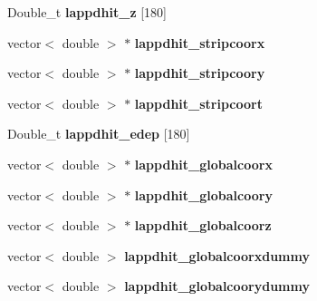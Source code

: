\begin{DoxyCompactItemize}
\item 
\hypertarget{classLAPPDTree_a73e138836f63b843c99fbe3951f7e504}{Double\-\_\-t {\bfseries lappdhit\-\_\-z} \mbox{[}180\mbox{]}}\label{classLAPPDTree_a73e138836f63b843c99fbe3951f7e504}

\item 
\hypertarget{classLAPPDTree_aa5f1d299a73e165905b798a925206de5}{vector$<$ double $>$ $\ast$ {\bfseries lappdhit\-\_\-stripcoorx}}\label{classLAPPDTree_aa5f1d299a73e165905b798a925206de5}

\item 
\hypertarget{classLAPPDTree_a1a9420e83fa6ac964448bd89fb613248}{vector$<$ double $>$ $\ast$ {\bfseries lappdhit\-\_\-stripcoory}}\label{classLAPPDTree_a1a9420e83fa6ac964448bd89fb613248}

\item 
\hypertarget{classLAPPDTree_a07b7a60f594d559022c75cc8962a673e}{vector$<$ double $>$ $\ast$ {\bfseries lappdhit\-\_\-stripcoort}}\label{classLAPPDTree_a07b7a60f594d559022c75cc8962a673e}

\item 
\hypertarget{classLAPPDTree_a361c88caa35c7b75c6625d1726fd3116}{Double\-\_\-t {\bfseries lappdhit\-\_\-edep} \mbox{[}180\mbox{]}}\label{classLAPPDTree_a361c88caa35c7b75c6625d1726fd3116}

\item 
\hypertarget{classLAPPDTree_abbf80a1da763ec467ead614fd4289718}{vector$<$ double $>$ $\ast$ {\bfseries lappdhit\-\_\-globalcoorx}}\label{classLAPPDTree_abbf80a1da763ec467ead614fd4289718}

\item 
\hypertarget{classLAPPDTree_a4d4353d05db2632541d8a34b825cc5e8}{vector$<$ double $>$ $\ast$ {\bfseries lappdhit\-\_\-globalcoory}}\label{classLAPPDTree_a4d4353d05db2632541d8a34b825cc5e8}

\item 
\hypertarget{classLAPPDTree_a44dc4554d5ea50fe0043d6d5e83292d4}{vector$<$ double $>$ $\ast$ {\bfseries lappdhit\-\_\-globalcoorz}}\label{classLAPPDTree_a44dc4554d5ea50fe0043d6d5e83292d4}

\item 
\hypertarget{classLAPPDTree_a842bd00c916ff704c337885e944a2597}{vector$<$ double $>$ {\bfseries lappdhit\-\_\-globalcoorxdummy}}\label{classLAPPDTree_a842bd00c916ff704c337885e944a2597}

\item 
\hypertarget{classLAPPDTree_a43f80af2bdabd39c31346a526b8e9a5c}{vector$<$ double $>$ {\bfseries lappdhit\-\_\-globalcoorydummy}}\label{classLAPPDTree_a43f80af2bdabd39c31346a526b8e9a5c}


\end{DoxyCompactItemize}
